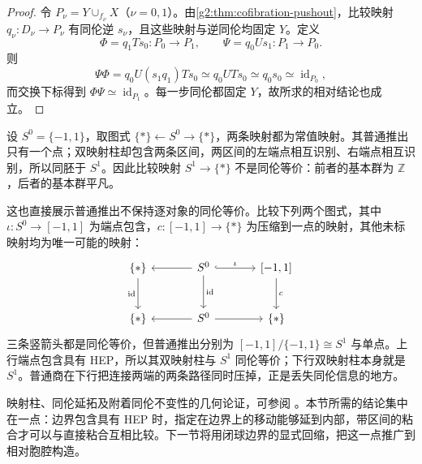\begin{proof}
	令 \(P_\nu=Y\cup_{f_\nu}X\)（\(\nu=0,1\)）。由\cref{g2:thm:cofibration-pushout}，比较映射 \(q_\nu:D_\nu\to P_\nu\) 有同伦逆 \(s_\nu\)，且这些映射与逆同伦均固定 \(Y\)。定义
	\[
		\Phi=q_1Ts_0:P_0\to P_1,\qquad
		\Psi=q_0Us_1:P_1\to P_0.
	\]
	则
	\[
		\Psi\Phi=q_0U(s_1q_1)Ts_0
		\simeq q_0UTs_0
		\simeq q_0s_0
		\simeq\operatorname{id}_{P_0},
	\]
	而交换下标得到 \(\Phi\Psi\simeq\operatorname{id}_{P_1}\)。每一步同伦都固定 \(Y\)，故所求的相对结论也成立。
\end{proof}

\begin{example}\label{g2:exm:pushout-not-homotopy-invariant}
	设 \(S^0=\{-1,1\}\)，取图式 \(\{*\}\leftarrow S^0\to\{*\}\)，两条映射都为常值映射。其普通推出只有一个点；双映射柱却包含两条区间，两区间的左端点相互识别、右端点相互识别，所以同胚于 \(S^1\)。因此比较映射 \(S^1\to\{*\}\) 不是同伦等价：前者的基本群为 \(\mathbb Z\)，后者的基本群平凡。

	这也直接展示普通推出不保持逐对象的同伦等价。比较下列两个图式，其中 \(\iota:S^0\to[-1,1]\) 为端点包含，\(c:[-1,1]\to\{*\}\) 为压缩到一点的映射，其他未标映射均为唯一可能的映射：
	\[
		\begin{tikzcd}[column sep=large,row sep=large]
			\{*\} \arrow[d,"\operatorname{id}"'] & S^0 \arrow[l] \arrow[r,hook,"\iota"] \arrow[d,"\operatorname{id}"] & {[-1,1]} \arrow[d,"c"] \\
			\{*\} & S^0 \arrow[l] \arrow[r] & \{*\}
		\end{tikzcd}
	\]
	三条竖箭头都是同伦等价，但普通推出分别为 \([-1,1]/\{-1,1\}\cong S^1\) 与单点。上行端点包含具有 HEP，所以其双映射柱与 \(S^1\) 同伦等价；下行双映射柱本身就是 \(S^1\)。普通商在下行把连接两端的两条路径同时压掉，正是丢失同伦信息的地方。
\end{example}

映射柱、同伦延拓及附着同伦不变性的几何论证，可参阅 \cite[第0章，The Homotopy Extension Property]{Hatcher2002}。本节所需的结论集中在一点：边界包含具有 HEP 时，指定在边界上的移动能够延到内部，带区间的粘合才可以与直接粘合互相比较。下一节将用闭球边界的显式回缩，把这一点推广到相对胞腔构造。

